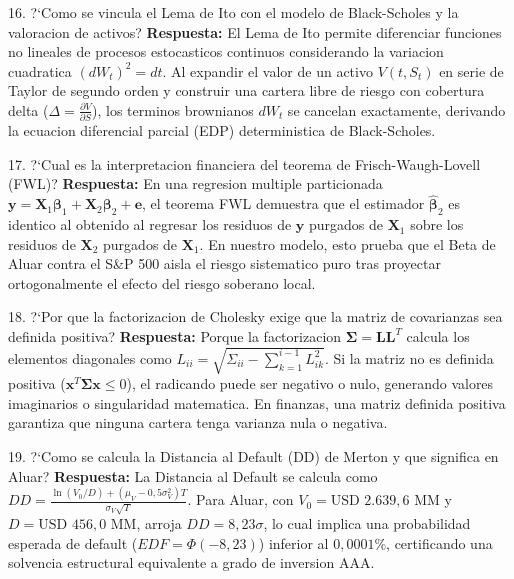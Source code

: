 \documentclass[10pt,a4paper]{article}
\theoremstyle{definition}
\begin{document}
\begin{examquestion}{16. ?`Como se vincula el Lema de Ito con el modelo de Black-Scholes y la valoracion de activos?}
\textbf{Respuesta:} El Lema de Ito permite diferenciar funciones no lineales de procesos estocasticos continuos considerando la variacion cuadratica $(dW_t)^2 = dt$. Al expandir el valor de un activo $V(t, S_t)$ en serie de Taylor de segundo orden y construir una cartera libre de riesgo con cobertura delta ($\Delta = \frac{\partial V}{\partial S}$), los terminos brownianos $dW_t$ se cancelan exactamente, derivando la ecuacion diferencial parcial (EDP) deterministica de Black-Scholes.
\end{examquestion}

\begin{examquestion}{17. ?`Cual es la interpretacion financiera del teorema de Frisch-Waugh-Lovell (FWL)?}
\textbf{Respuesta:} En una regresion multiple particionada $\mathbf{y} = \mathbf{X}_1 \boldsymbol{\beta}_1 + \mathbf{X}_2 \boldsymbol{\beta}_2 + \mathbf{e}$, el teorema FWL demuestra que el estimador $\hat{\boldsymbol{\beta}}_2$ es identico al obtenido al regresar los residuos de $\mathbf{y}$ purgados de $\mathbf{X}_1$ sobre los residuos de $\mathbf{X}_2$ purgados de $\mathbf{X}_1$. En nuestro modelo, esto prueba que el Beta de Aluar contra el S\&P 500 aisla el riesgo sistematico puro tras proyectar ortogonalmente el efecto del riesgo soberano local.
\end{examquestion}

\begin{examquestion}{18. ?`Por que la factorizacion de Cholesky exige que la matriz de covarianzas sea definida positiva?}
\textbf{Respuesta:} Porque la factorizacion $\mathbf{\Sigma} = \mathbf{L}\mathbf{L}^T$ calcula los elementos diagonales como $L_{ii} = \sqrt{\Sigma_{ii} - \sum_{k=1}^{i-1} L_{ik}^2}$. Si la matriz no es definida positiva ($\mathbf{x}^T \mathbf{\Sigma} \mathbf{x} \le 0$), el radicando puede ser negativo o nulo, generando valores imaginarios o singularidad matematica. En finanzas, una matriz definida positiva garantiza que ninguna cartera tenga varianza nula o negativa.
\end{examquestion}

\begin{examquestion}{19. ?`Como se calcula la Distancia al Default (DD) de Merton y que significa en Aluar?}
\textbf{Respuesta:} La Distancia al Default se calcula como $DD = \frac{\ln(V_0/D) + (\mu_V - 0,5\sigma_V^2)T}{\sigma_V \sqrt{T}}$. Para Aluar, con $V_0 = \text{USD } 2.639,6\text{ MM}$ y $D = \text{USD } 456,0\text{ MM}$, arroja $DD = 8,23\sigma$, lo cual implica una probabilidad esperada de default ($EDF = \Phi(-8,23)$) inferior al $0,0001\%$, certificando una solvencia estructural equivalente a grado de inversion AAA.
\end{examquestion}
\end{document}
